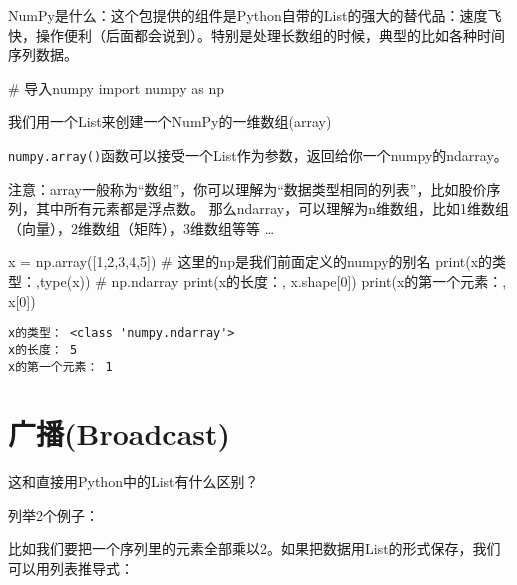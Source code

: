 \documentclass[
  letterpaper,
  DIV=11,
  numbers=noendperiod]{scrreprt}
\newenvironment{Shaded}{\begin{snugshade}}{\end{snugshade}}
\newcommand{\BuiltInTok}[1]{\textcolor[rgb]{0.00,0.23,0.31}{#1}}
\newcommand{\CommentTok}[1]{\textcolor[rgb]{0.37,0.37,0.37}{#1}}
\newcommand{\DecValTok}[1]{\textcolor[rgb]{0.68,0.00,0.00}{#1}}
\newcommand{\ImportTok}[1]{\textcolor[rgb]{0.00,0.46,0.62}{#1}}
\newcommand{\NormalTok}[1]{\textcolor[rgb]{0.00,0.23,0.31}{#1}}
\newcommand{\OperatorTok}[1]{\textcolor[rgb]{0.37,0.37,0.37}{#1}}
\newcommand{\StringTok}[1]{\textcolor[rgb]{0.13,0.47,0.30}{#1}}
\begin{document}
NumPy是什么：这个包提供的组件是Python自带的List的强大的替代品：速度飞快，操作便利（后面都会说到）。特别是处理长数组的时候，典型的比如各种时间序列数据。

\begin{Shaded}
\begin{Highlighting}[]
\CommentTok{\# 导入numpy}
\ImportTok{import}\NormalTok{ numpy }\ImportTok{as}\NormalTok{ np}
\end{Highlighting}
\end{Shaded}

我们用一个List来创建一个NumPy的一维数组(array)

\texttt{numpy.array()}函数可以接受一个List作为参数，返回给你一个numpy的ndarray。

注意：array一般称为``数组''，你可以理解为``数据类型相同的列表''，比如股价序列，其中所有元素都是浮点数。
那么ndarray，可以理解为n维数组，比如1维数组（向量），2维数组（矩阵），3维数组等等
\ldots{}

\begin{Shaded}
\begin{Highlighting}[]
\NormalTok{x }\OperatorTok{=}\NormalTok{ np.array([}\DecValTok{1}\NormalTok{,}\DecValTok{2}\NormalTok{,}\DecValTok{3}\NormalTok{,}\DecValTok{4}\NormalTok{,}\DecValTok{5}\NormalTok{]) }
\CommentTok{\# 这里的np是我们前面定义的numpy的别名}
\BuiltInTok{print}\NormalTok{(}\StringTok{\textquotesingle{}x的类型：\textquotesingle{}}\NormalTok{,}\BuiltInTok{type}\NormalTok{(x)) }\CommentTok{\# np.ndarray}
\BuiltInTok{print}\NormalTok{(}\StringTok{\textquotesingle{}x的长度：\textquotesingle{}}\NormalTok{, x.shape[}\DecValTok{0}\NormalTok{])}
\BuiltInTok{print}\NormalTok{(}\StringTok{\textquotesingle{}x的第一个元素：\textquotesingle{}}\NormalTok{, x[}\DecValTok{0}\NormalTok{])}
\end{Highlighting}
\end{Shaded}

\begin{verbatim}
x的类型： <class 'numpy.ndarray'>
x的长度： 5
x的第一个元素： 1
\end{verbatim}

\hypertarget{ux5e7fux64adbroadcast}{%
\section{广播(Broadcast)}\label{ux5e7fux64adbroadcast}}

这和直接用Python中的List有什么区别？

列举2个例子：

比如我们要把一个序列里的元素全部乘以2。如果把数据用List的形式保存，我们可以用列表推导式：
\end{document}

